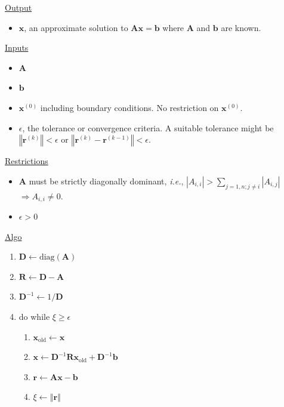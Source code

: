\begin{algorithm}[h]
\uline{Output}
\begin{itemize}
\item $\bm{x}$, an approximate solution to $\bm{A}\bm{x}=\bm{b}$ where
$\bm{A}$ and $\bm{b}$ are known.
\end{itemize}
\uline{Inputs}
\begin{itemize}
\item $\bm{A}$
\item $\bm{b}$
\item $\bm{x}^{\left(0\right)}$ including boundary conditions. No restriction
on $\bm{x}^{\left(0\right)}$.
\item $\epsilon$, the tolerance or convergence criteria. A suitable tolerance
might be $\left\Vert \bm{r}^{\left(k\right)}\right\Vert <\epsilon$
or $\left\Vert \bm{r}^{\left(k\right)}-\bm{r}^{\left(k-1\right)}\right\Vert <\epsilon$. 
\end{itemize}
\uline{Restrictions}
\begin{itemize}
\item $\bm{A}$ must be strictly diagonally dominant, \emph{i.e.}, $\left|A_{i,i}\right|>\sum_{j=1,n;j\neq i}\left|A_{i,j}\right|$
$\Rightarrow A_{i,i}\neq0$.
\item $\epsilon>0$
\end{itemize}
\uline{Algo}
\begin{enumerate}
\item $\bm{D}\longleftarrow\mbox{diag}\left(\bm{A}\right)$
\item $\bm{R}\longleftarrow\bm{D}-\bm{A}$
\item $\bm{D}^{-1}\longleftarrow1/\bm{D}$
\item do while $\xi\geq\epsilon$ 

\begin{enumerate}
\item $\bm{x}_{\mathrm{old}}\longleftarrow\bm{x}$
\item $\bm{x}\longleftarrow\bm{D}^{-1}\bm{R}\bm{x}_{\mathrm{old}}+\bm{D}^{-1}\bm{b}$
\item $\bm{r}\longleftarrow\bm{A}\bm{x}-\bm{b}$
\item $\xi\longleftarrow\left\Vert \bm{r}\right\Vert $
\end{enumerate}
\end{enumerate}
\caption{%
Jacobi's algorithm\label{alg:Jacobi's-algorithm}%
}
\end{algorithm}



